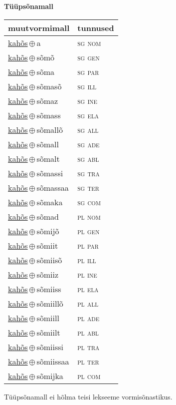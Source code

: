 

\vspace{3.5em}
\noindent \begin{minipage}{\textwidth}
\noindent \textbf{Tüüpsõnamall \,}\\

\begin{sideways}
\begin{tabular}{l l}
muutvormimall & tunnused \\
\hline
\underline{kahõs}\,$\oplus$\,a & \textsc{ sg nom } \\
\underline{kahõs}\,$\oplus$\,sõmõ & \textsc{ sg gen } \\
\underline{kahõs}\,$\oplus$\,sõma & \textsc{ sg par } \\
\underline{kahõs}\,$\oplus$\,sõmasõ & \textsc{ sg ill } \\
\underline{kahõs}\,$\oplus$\,sõmaz & \textsc{ sg ine } \\
\underline{kahõs}\,$\oplus$\,sõmass & \textsc{ sg ela } \\
\underline{kahõs}\,$\oplus$\,sõmallõ & \textsc{ sg all } \\
\underline{kahõs}\,$\oplus$\,sõmall & \textsc{ sg ade } \\
\underline{kahõs}\,$\oplus$\,sõmalt & \textsc{ sg abl } \\
\underline{kahõs}\,$\oplus$\,sõmassi & \textsc{ sg tra } \\
\underline{kahõs}\,$\oplus$\,sõmassaa & \textsc{ sg ter } \\
\underline{kahõs}\,$\oplus$\,sõmaka & \textsc{ sg com } \\
\underline{kahõs}\,$\oplus$\,sõmad & \textsc{ pl nom } \\
\underline{kahõs}\,$\oplus$\,sõmijõ & \textsc{ pl gen } \\
\underline{kahõs}\,$\oplus$\,sõmiit & \textsc{ pl par } \\
\underline{kahõs}\,$\oplus$\,sõmiisõ & \textsc{ pl ill } \\
\underline{kahõs}\,$\oplus$\,sõmiiz & \textsc{ pl ine } \\
\underline{kahõs}\,$\oplus$\,sõmiiss & \textsc{ pl ela } \\
\underline{kahõs}\,$\oplus$\,sõmiillõ & \textsc{ pl all } \\
\underline{kahõs}\,$\oplus$\,sõmiill & \textsc{ pl ade } \\
\underline{kahõs}\,$\oplus$\,sõmiilt & \textsc{ pl abl } \\
\underline{kahõs}\,$\oplus$\,sõmiissi & \textsc{ pl tra } \\
\underline{kahõs}\,$\oplus$\,sõmiissaa & \textsc{ pl ter } \\
\underline{kahõs}\,$\oplus$\,sõmijka & \textsc{ pl com } \\
\end{tabular}
\end{sideways}
\label{tab:tüüpsõnamall-kahõsa}

\end{minipage}

 
\vspace{1em}
\noindent Tüüpsõnamall  ei hõlma teisi lekseeme vormi\-sõnastikus.
